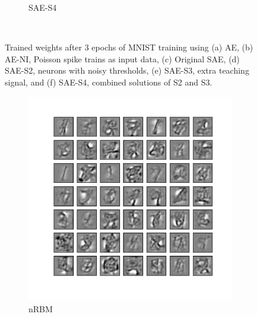 \begin{figure}
\begin{subfigure}[t]{0.4\textwidth}
		\caption{SAE-S4}
	\end{subfigure}\\
	\caption[Comparisons of trained weights using (spiking) AEs.]{Trained weights after 3 epochs of MNIST training using (a) AE, (b) AE-NI, Poisson spike trains as input data, (c) Original SAE, (d) SAE-S2, neurons with noisy thresholds, (e) SAE-S3, extra teaching signal, and (f) SAE-S4, combined solutions of S2 and S3.}
	\label{fig:weights_ae}
\end{figure}

\begin{figure}
	\centering
	\begin{subfigure}[t]{0.4\textwidth}
		\includegraphics[width=\textwidth]{pics_sdlm/32_MNIST_RBM/2_60000_0.pdf}
		\caption{nRBM}
	\end{subfigure}
	\begin{subfigure}[t]{0.4\textwidth}

\end{subfigure}
\end{figure}
